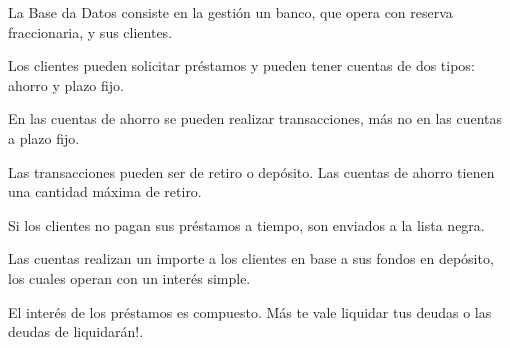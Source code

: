 La Base da Datos consiste en la gestión un banco, que opera con reserva fraccionaria, y sus clientes.

Los clientes pueden solicitar préstamos y pueden tener cuentas de dos tipos: ahorro y plazo fijo.

En las cuentas de ahorro se pueden realizar transacciones, más no en las cuentas a plazo fijo.

Las transacciones pueden ser de retiro o depósito. Las cuentas de ahorro tienen una cantidad máxima de retiro.

Si los clientes no pagan sus préstamos a tiempo, son enviados a la lista negra.

Las cuentas realizan un importe a los clientes en base a sus fondos en depósito, los cuales operan con un interés simple.

El interés de los préstamos es compuesto. Más te vale liquidar tus deudas o las deudas de liquidarán!.